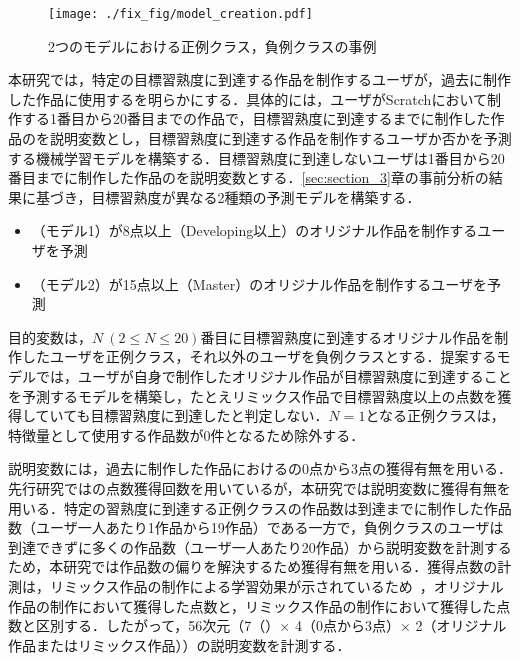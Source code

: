 \documentclass[submit]{ipsj}
\begin{document}
\begin{figure*}[t]
    \centering
    \texttt{[image: ./fix\_fig/model\_creation.pdf]}
    \caption{2つのモデルにおける正例クラス，負例クラスの事例}
    \label{fig:model_creation}
\end{figure*}

本研究では，特定の目標習熟度に到達する作品を制作するユーザが，過去に制作した作品に使用する\textcolor{red}{}を明らかにする．具体的には，ユーザがScratchにおいて制作する1番目から20番目までの作品で，目標習熟度に到達するまでに制作した作品の\textcolor{red}{}を説明変数とし，目標習熟度に到達する作品を制作するユーザか否かを予測する機械学習モデルを構築する．目標習熟度に到達しないユーザは1番目から20番目までに制作した作品の\textcolor{red}{}を説明変数とする．\ref{sec:section_3}章の事前分析の結果に基づき，目標習熟度が異なる2種類の予測モデルを構築する．

\begin{itemize}
\item （モデル1）\textcolor{red}{}が8点以上（Developing以上）のオリジナル作品を制作するユーザを予測
\item （モデル2）\textcolor{red}{}が15点以上（Master）のオリジナル作品を制作するユーザを予測
\end{itemize}

目的変数は，{$N~(2 \leq N \leq 20)$}番目に目標習熟度に到達するオリジナル作品を制作したユーザを正例クラス，それ以外のユーザを負例クラスとする．\textcolor{red}{}提案するモデルでは，ユーザが自身で制作したオリジナル作品が目標習熟度に到達することを予測するモデルを構築し，たとえリミックス作品で目標習熟度以上の点数を獲得していても目標習熟度に到達したと判定しない．{$N=1$}となる正例クラスは，特徴量として使用する作品数が0件となるため除外する．

説明変数には，過去に制作した作品における\textcolor{red}{}の0点から3点の獲得有無を用いる．先行研究では\textcolor{red}{}の点数獲得回数を用いているが，本研究では説明変数に獲得有無を用いる．特定の習熟度に到達する正例クラスの作品数は到達までに制作した作品数（ユーザ一人あたり1作品から19作品）である一方で，負例クラスのユーザは到達できずに多くの作品数（ユーザ一人あたり20作品）から説明変数を計測するため，本研究では作品数の偏りを解決するため獲得有無を用いる．獲得点数の計測は，リミックス作品の制作による学習効果が示されているため~\cite{Dasgupta_2016}，オリジナル作品の制作において獲得した点数と，リミックス作品の制作において獲得した点数と区別する．\textcolor{red}{}したがって，56次元（7（\textcolor{red}{}）{$\times$} 4（0点から3点）{$\times$} 2（オリジナル作品またはリミックス作品））の説明変数を計測する．
\end{document}
